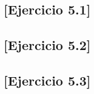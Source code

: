 \documentclass[spanish]{article}
\begin{document}
		\subsection{[Ejercicio 5.1]}
		\label{sec:5.1}

			\paragraph{}


		\subsection{[Ejercicio 5.2]}
		\label{sec:5.2}

			\paragraph{}


		\subsection{[Ejercicio 5.3]}
		\label{sec:5.3}

			\paragraph{}



	\nocite{subject:mio}
	
  
\end{document}
